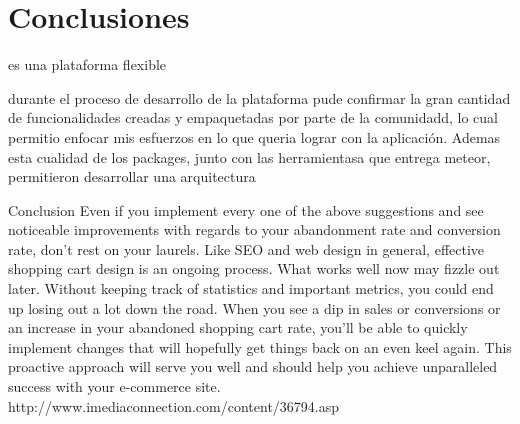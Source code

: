 \chapter{Conclusiones} \label{cap:conclusiones}


\meteorNAME es una plataforma flexible


durante el proceso de desarrollo de la plataforma pude confirmar la gran cantidad de funcionalidades creadas y empaquetadas por parte de la comunidadd, lo cual permitio enfocar mis esfuerzos en lo que queria lograr con la aplicación.
Ademas esta cualidad de los packages, junto con las herramientasa que entrega meteor, permitieron desarrollar una arquitectura 





Conclusion
Even if you implement every one of the above suggestions and see noticeable improvements with regards to your abandonment rate and conversion rate, don't rest on your laurels. Like SEO and web design in general, effective shopping cart design is an ongoing process. What works well now may fizzle out later. Without keeping track of statistics and important metrics, you could end up losing out a lot down the road. When you see a dip in sales or conversions or an increase in your abandoned shopping cart rate, you'll be able to quickly implement changes that will hopefully get things back on an even keel again. This proactive approach will serve you well and should help you achieve unparalleled success with your e-commerce site.
http://www.imediaconnection.com/content/36794.asp